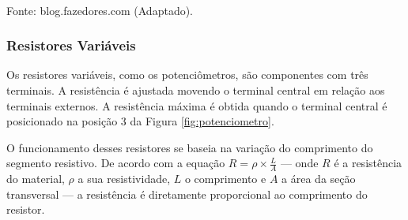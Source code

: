 \documentclass[12pt]{article}
\begin{document}
    \begin{table}[H]
        \caption{Tabela do cores dos resistores fixos.}
        \label{tab:corResist}
        \centering
        \\
        \footnotesize Fonte: blog.fazedores.com (Adaptado)\nocite{codigo_cores_resistores}.
    \end{table}

    \subsubsection{Resistores Variáveis}\indent

    Os resistores variáveis, como os potenciômetros, são componentes com três terminais. A resistência é ajustada movendo o terminal central em relação aos terminais externos. A resistência máxima é obtida quando o terminal central é posicionado na posição 3 da Figura \ref{fig:potenciometro}.
    
    O funcionamento desses resistores se baseia na variação do comprimento do segmento resistivo. De acordo com a equação $R = \rho\times\frac{L}{A}$ --- onde $R$ é a resistência do material, $\rho$ a sua resistividade, $L$ o comprimento e $A$ a área da seção transversal --- a resistência é diretamente proporcional ao comprimento do resistor.
    
\end{document}

